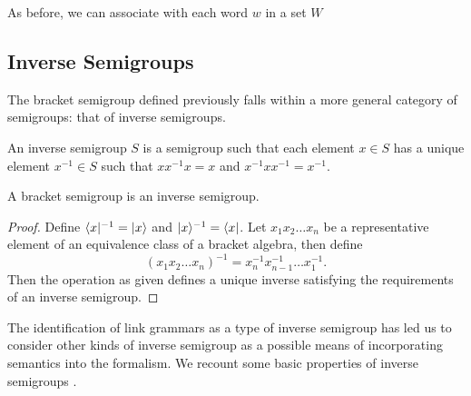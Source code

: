 \documentclass[12pt]{report}
\begin{document}
As before, we can associate with each word $w$ in a set $W$ 

\begin{prop}

\end{prop}


\subsection{Inverse Semigroups}
\label{inverse}

The bracket semigroup defined previously falls within a more general category of semigroups: that of inverse semigroups.

\begin{defn}
An inverse semigroup $S$ is a semigroup such that each element $x \in S$ has a unique element $x^{-1} \in S$ such that $xx^{-1}x = x$ and $x^{-1}xx^{-1} = x^{-1}$.
\end{defn}

\begin{prop}
A bracket semigroup is an inverse semigroup.
\end{prop}

\begin{proof}
Define $\langle x|^{-1} = |x \rangle$ and $|x \rangle^{-1} = \langle x|$. Let $x_1x_2\ldots x_n$ be a representative element of an equivalence class of a bracket algebra, then define
$$(x_1x_2\ldots x_n)^{-1} = x_n^{-1}x_{n-1}^{-1}\ldots x_1^{-1}.$$
Then the operation as given defines a unique inverse satisfying the requirements of an inverse semigroup.
\end{proof}

The identification of link grammars as a type of inverse semigroup  has led us to consider other kinds of inverse semigroup as a possible means of incorporating semantics into the formalism. We recount some basic properties of inverse semigroups \cite{Howie:76}.
\end{document}
